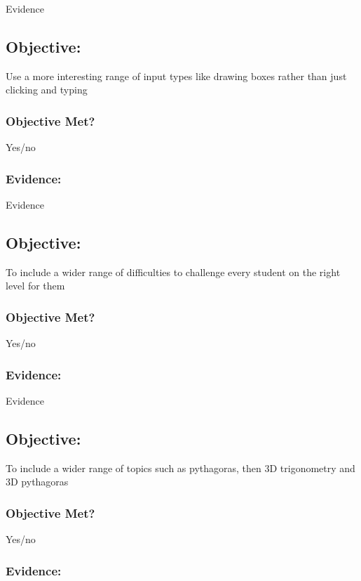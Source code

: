 Evidence

\subsection{Objective: }

Use a more interesting range of input types like drawing boxes rather than just clicking and typing

\subsubsection{Objective Met?}

Yes/no 

\subsubsection{Evidence: }

Evidence

\subsection{Objective: }

To include a wider range of difficulties to challenge every student on the right level for them

\subsubsection{Objective Met?}

Yes/no 

\subsubsection{Evidence: }

Evidence

\subsection{Objective: }

To include a wider range of topics such as pythagoras, then 3D trigonometry and 3D pythagoras

\subsubsection{Objective Met?}

Yes/no 

\subsubsection{Evidence: }

